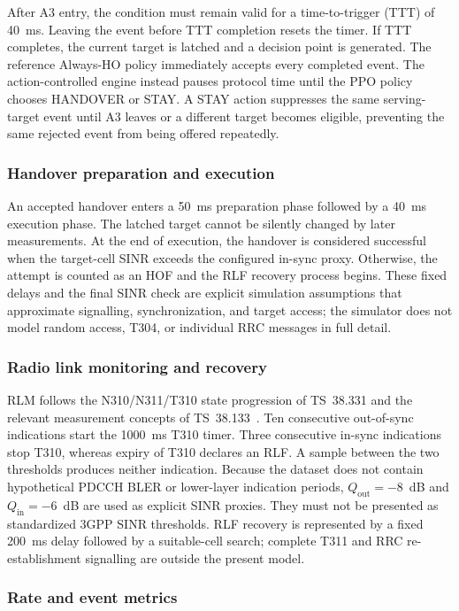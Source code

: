 After A3 entry, the condition must remain valid for a time-to-trigger (TTT) of
40~ms. Leaving the event before TTT completion resets the timer. If TTT
completes, the current target is latched and a decision point is generated. The
reference Always-HO policy immediately accepts every completed event. The
action-controlled engine instead pauses protocol time until the PPO policy
chooses HANDOVER or STAY. A STAY action suppresses the same serving-target
event until A3 leaves or a different target becomes eligible, preventing the
same rejected event from being offered repeatedly.

\subsubsection{Handover preparation and execution}

An accepted handover enters a 50~ms preparation phase followed by a 40~ms
execution phase. The latched target cannot be silently changed by later
measurements. At the end of execution, the handover is considered successful
when the target-cell SINR exceeds the configured in-sync proxy. Otherwise, the
attempt is counted as an HOF and the RLF recovery process begins. These fixed
delays and the final SINR check are explicit simulation assumptions that
approximate signalling, synchronization, and target access; the simulator does
not model random access, T304, or individual RRC messages in full detail.

\subsubsection{Radio link monitoring and recovery}

RLM follows the N310/N311/T310 state progression of TS~38.331 and the relevant
measurement concepts of TS~38.133~\cite{3gpp38133}. Ten consecutive
out-of-sync indications start the 1000~ms T310 timer. Three consecutive
in-sync indications stop T310, whereas expiry of T310 declares an RLF. A
sample between the two thresholds produces neither indication. Because the
dataset does not contain hypothetical PDCCH BLER or lower-layer indication
periods, $Q_{\mathrm{out}}=-8$~dB and $Q_{\mathrm{in}}=-6$~dB are used as
explicit SINR proxies. They must not be presented as standardized 3GPP SINR
thresholds. RLF recovery is represented by a fixed 200~ms delay followed by a
suitable-cell search; complete T311 and RRC re-establishment signalling are
outside the present model.

\subsubsection{Rate and event metrics}

